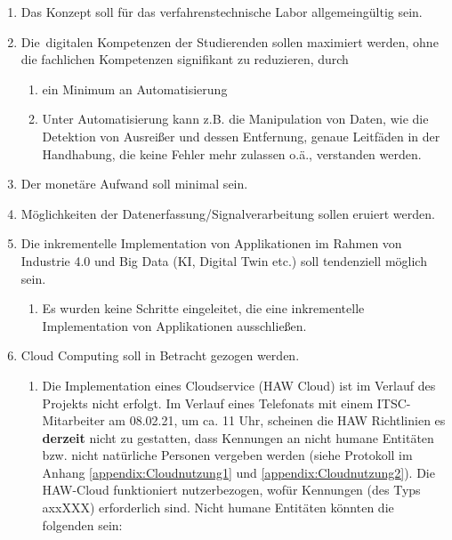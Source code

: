 \begin{enumerate}[leftmargin = 1.5em, label = \textbullet , itemsep = 0.1em]
\item[\cmark] Das Konzept soll für das verfahrenstechnische Labor allgemeingültig sein.
\item[\cmark] Die \glqq \,{\Menlo digitalen Kompetenzen}\grqq{} der Studierenden sollen maximiert werden, ohne die fachlichen Kompetenzen signifikant zu reduzieren, durch 


	\begin{enumerate}[leftmargin = 1.5em, label = -- , itemsep = 0.1em]
	\item[\cmark] ein Minimum an Automatisierung 
	\item[\cmark] Unter Automatisierung kann z.B.  die Manipulation von Daten, wie die Detektion von Ausreißer und dessen Entfernung, genaue Leitfäden in der Handhabung, die keine Fehler mehr zulassen o.ä., verstanden werden.
	\end{enumerate}
	
\item[\cmark] Der monetäre Aufwand soll minimal sein.
\item[\cmark] Möglichkeiten der Datenerfassung/Signalverarbeitung sollen eruiert werden. 
\item[\cmark] Die inkrementelle Implementation von Applikationen im Rahmen von Industrie 4.0 und Big Data (KI, Digital Twin etc.) soll tendenziell möglich sein.
	\begin{enumerate}[leftmargin = 1.5em, label = $\diamond$ , itemsep = 0.1em]
	\item Es wurden keine Schritte eingeleitet, die eine inkrementelle Implementation von Applikationen ausschließen.
	\end{enumerate}


\item[\cmark] Cloud Computing soll in Betracht gezogen werden.

	\begin{enumerate}[leftmargin = 1.5em, label = $\diamond$ , itemsep = 0.1em]
	\item Die Implementation eines Cloudservice (HAW Cloud) ist im Verlauf des Projekts nicht erfolgt. Im Verlauf eines Telefonats mit einem ITSC-Mitarbeiter am 08.02.21, um ca. 11 Uhr, scheinen die HAW Richtlinien es \textbf{derzeit} nicht zu gestatten, dass Kennungen an nicht humane Entitäten bzw. nicht natürliche Personen vergeben werden (siehe Protokoll im Anhang \ref{appendix:Cloudnutzung1} und \ref{appendix:Cloudnutzung2}). Die HAW-Cloud funktioniert nutzerbezogen, wofür Kennungen (des Typs axxXXX) erforderlich sind. Nicht humane Entitäten könnten die folgenden sein:
	 

\end{enumerate}
\end{enumerate}
